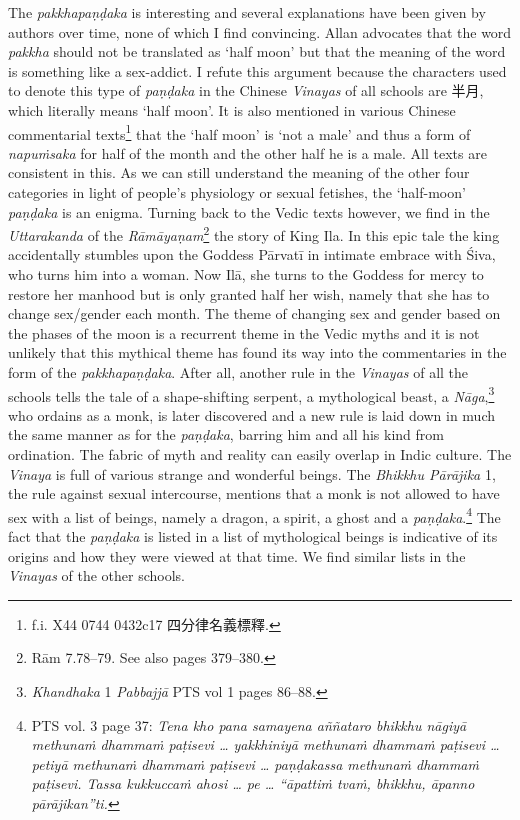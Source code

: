 The {\em pakkhapaṇḍaka} is interesting and several explanations have been given by authors over time, none of which I find convincing. Allan \cite{bomhard} advocates that the word {\em pakkha} should not be translated as `half moon' but that the meaning of the word is something like a sex-addict. I refute this argument because the characters used to denote this type of {\em paṇḍaka} in the Chinese {\em Vinayas} of all schools are 半月, which literally means `half moon'. It is also mentioned in various Chinese commentarial texts\footnote{f.i. X44 0744 0432c17 四分律名義標釋.} that the `half moon' is `not a male' and thus a form of {\em napuṁsaka} for half of the month and the other half he is a male. All texts are consistent in this. As we can still understand the meaning of the other four categories in light of people's physiology or sexual fetishes, the `half-moon' {\em paṇḍaka} is an enigma. Turning back to the Vedic texts however, we find in the {\em Uttarakanda} of the {\em Rāmāyaṇam}\footnote{Rām 7.78–79. See also \cite{goldman} pages 379–380.} the story of King Ila. In this epic tale the king accidentally stumbles upon the Goddess Pārvatī in intimate embrace with Śiva, who turns him into a woman. Now Ilā, she turns to the Goddess for mercy to restore her manhood but is only granted half her wish, namely that she has to change sex/gender each month. The theme of changing sex and gender based on the phases of the moon is a recurrent theme in the Vedic myths and it is not unlikely that this mythical theme has found its way into the commentaries in the form of the {\em pakkhapaṇḍaka}. After all, another rule in the {\em Vinayas} of all the schools tells the tale of a shape-shifting serpent, a mythological beast, a {\em Nāga},\footnote{{\em Khandhaka} 1 {\em Pabbajjā} PTS vol 1 pages 86–88.} who ordains as a monk, is later discovered and a new rule is laid down in much the same manner as for the {\em paṇḍaka}, barring him and all his kind from ordination. The fabric of myth and reality can easily overlap in Indic culture. The {\em Vinaya} is full of various strange and wonderful beings. The ­{\em Bhikkhu Pā­rāji­ka} 1, the rule against sexual intercourse, mentions that a monk is not allowed to have sex with a list of beings, namely a dragon, a spirit, a ghost and a {\em paṇḍaka}.\footnote{PTS vol. 3 page 37: {\em Tena kho pana samayena aññataro bhikkhu nāgiyā methunaṁ dhammaṁ paṭisevi … yakkhiniyā methunaṁ dhammaṁ paṭisevi … petiyā methunaṁ dhammaṁ paṭisevi … paṇḍakassa methunaṁ dhammaṁ paṭisevi. Tassa kukkuccaṁ ahosi … pe … “āpattiṁ tvaṁ, bhikkhu, āpanno pārājikan”ti.}} The fact that the {\em paṇḍaka} is listed in a list of mythological beings is indicative of its origins and how they were viewed at that time. We find similar lists in the {\em Vinayas} of the other schools.

